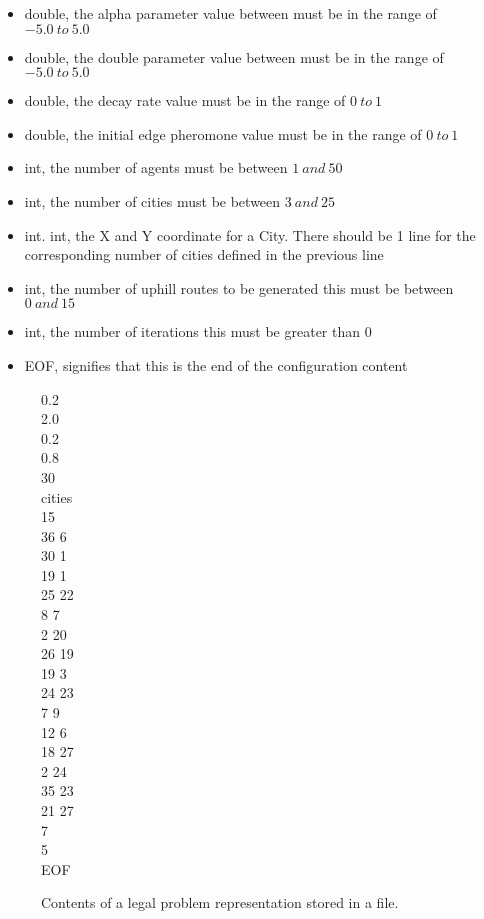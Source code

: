 \begin{itemize}
\item double, the alpha parameter value between must be in the range of $-5.0\ to\ 5.0$
\item double, the double parameter value between must be in the range of $-5.0\ to\ 5.0$
\item double, the decay rate value must be in the range of $0\ to\ 1$
\item double, the initial edge pheromone value must be in the range of $0\ to\ 1$
\item int, the number of agents must be between $1\ and\ 50$
\item int, the number of cities must be between $3\ and\ 25$
\item int. int, the X and Y coordinate for a City. There should be 1 line for the corresponding number of cities defined in the previous line
\item int, the number of uphill routes to be generated this must be between $0\ and\ 15$
\item int, the number of iterations this must be greater than $0$
\item EOF, signifies that this is the end of the configuration content
\end{itemize}

\begin{figure}[H]
0.2 \\
2.0 \\
0.2 \\
0.8 \\
30 \\
cities \\
15 \\
36 6 \\
30 1 \\
19 1 \\
25 22 \\
8 7 \\
2 20 \\
26 19 \\
19 3 \\
24 23 \\
7 9 \\
12 6 \\
18 27 \\
2 24 \\
35 23 \\
21 27 \\
7 \\
5 \\
EOF
\caption{Contents of a legal problem representation stored in a file.}
\label{validConfig}
\end{figure}

